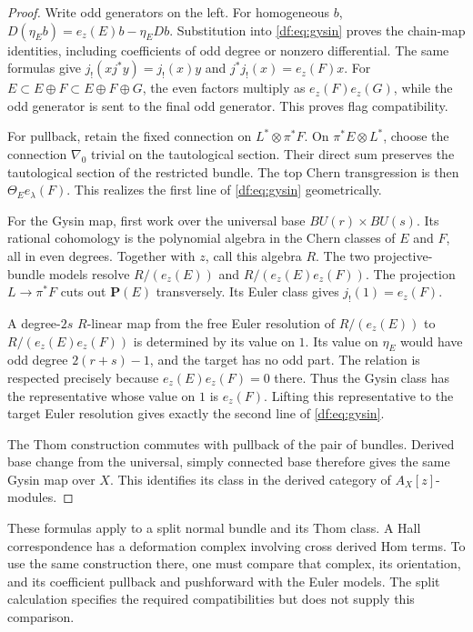 \begin{proof}
Write odd generators on the left. For homogeneous $b$,
$D(\eta_E b)=e_z(E)b-\eta_E Db$. Substitution into
\eqref{df:eq:gysin} proves the chain-map identities, including
coefficients of odd degree or nonzero differential. The same formulas
give $j_!(xj^*y)=j_!(x)y$ and $j^*j_!(x)=e_z(F)x$.
For $E\subset E\oplus F\subset E\oplus F\oplus G$,
the even factors multiply as $e_z(F)e_z(G)$, while the odd generator
is sent to the final odd generator. This proves flag compatibility.

For pullback, retain the fixed connection on $L^*\otimes\pi^*F$.
On $\pi^*E\otimes L^*$, choose the connection $\nabla_0$ trivial
on the tautological section. Their direct sum preserves the
tautological section of the restricted bundle.
The top Chern transgression is then $\Theta_E e_\lambda(F)$.
This realizes the first line of \eqref{df:eq:gysin} geometrically.

For the Gysin map, first work over the universal base
$BU(r)\times BU(s)$. Its rational cohomology is the polynomial
algebra in the Chern classes of $E$ and $F$, all in even degrees.
Together with $z$, call this algebra $R$. The two projective-bundle
models resolve $R/(e_z(E))$ and $R/(e_z(E)e_z(F))$.
The projection $L\to\pi^*F$ cuts out $\mathbf P(E)$ transversely.
Its Euler class gives $j_!(1)=e_z(F)$.

A degree-$2s$ $R$-linear map from the free Euler resolution of
$R/(e_z(E))$ to $R/(e_z(E)e_z(F))$ is determined by its value on $1$.
Its value on $\eta_E$ would have odd degree $2(r+s)-1$, and the
target has no odd part. The relation is respected precisely because
$e_z(E)e_z(F)=0$ there. Thus the Gysin class has the representative
whose value on $1$ is $e_z(F)$. Lifting this representative to the
target Euler resolution gives exactly the second line of
\eqref{df:eq:gysin}.

The Thom construction commutes with pullback of the pair of bundles.
Derived base change from the universal, simply connected base therefore
gives the same Gysin map over $X$. This identifies its class in the
derived category of $A_X[z]$-modules.
\end{proof}

These formulas apply to a split normal bundle and its Thom class.
A Hall correspondence has a deformation complex involving cross
derived Hom terms. To use the same construction there, one must compare
that complex, its orientation, and its coefficient pullback and pushforward
with the Euler models. The split calculation specifies the required
compatibilities but does not supply this comparison.

